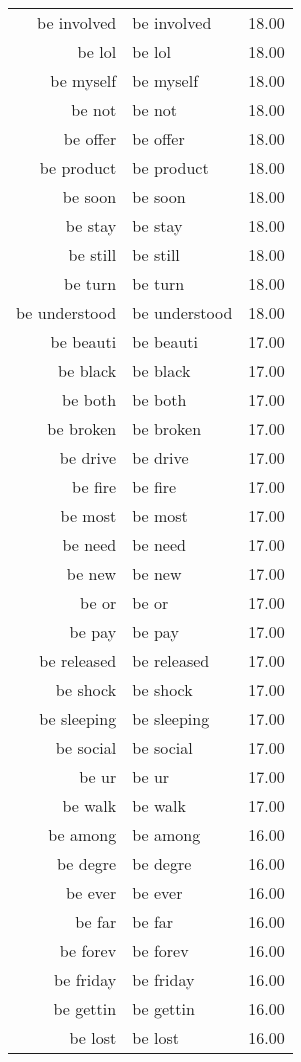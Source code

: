 \begin{table}[ht]
\begin{tabular}{rlr}
  be involved & be involved & 18.00 \\ 
  be lol & be lol & 18.00 \\ 
  be myself & be myself & 18.00 \\ 
  be not & be not & 18.00 \\ 
  be offer & be offer & 18.00 \\ 
  be product & be product & 18.00 \\ 
  be soon & be soon & 18.00 \\ 
  be stay & be stay & 18.00 \\ 
  be still & be still & 18.00 \\ 
  be turn & be turn & 18.00 \\ 
  be understood & be understood & 18.00 \\ 
  be beauti & be beauti & 17.00 \\ 
  be black & be black & 17.00 \\ 
  be both & be both & 17.00 \\ 
  be broken & be broken & 17.00 \\ 
  be drive & be drive & 17.00 \\ 
  be fire & be fire & 17.00 \\ 
  be most & be most & 17.00 \\ 
  be need & be need & 17.00 \\ 
  be new & be new & 17.00 \\ 
  be or & be or & 17.00 \\ 
  be pay & be pay & 17.00 \\ 
  be released & be released & 17.00 \\ 
  be shock & be shock & 17.00 \\ 
  be sleeping & be sleeping & 17.00 \\ 
  be social & be social & 17.00 \\ 
  be ur & be ur & 17.00 \\ 
  be walk & be walk & 17.00 \\ 
  be among & be among & 16.00 \\ 
  be degre & be degre & 16.00 \\ 
  be ever & be ever & 16.00 \\ 
  be far & be far & 16.00 \\ 
  be forev & be forev & 16.00 \\ 
  be friday & be friday & 16.00 \\ 
  be gettin & be gettin & 16.00 \\ 
  be lost & be lost & 16.00 \\ 

\end{tabular}
\end{table}
